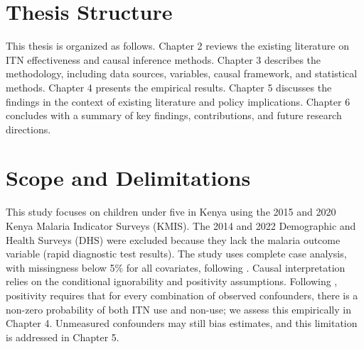 \section{Thesis Structure}

This thesis is organized as follows. Chapter 2 reviews the existing literature on ITN effectiveness and causal inference methods. Chapter 3 describes the methodology, including data sources, variables, causal framework, and statistical methods. Chapter 4 presents the empirical results. Chapter 5 discusses the findings in the context of existing literature and policy implications. Chapter 6 concludes with a summary of key findings, contributions, and future research directions.

\section{Scope and Delimitations}

This study focuses on children under five in Kenya using the 2015 and 2020 Kenya Malaria Indicator Surveys (KMIS). The 2014 and 2022 Demographic and Health Surveys (DHS) were excluded because they lack the malaria outcome variable (rapid diagnostic test results). The study uses complete case analysis, with missingness below 5\% for all covariates, following \citet{little2019statistical}. Causal interpretation relies on the conditional ignorability and positivity assumptions. Following \citet{westreich2010invited}, positivity requires that for every combination of observed confounders, there is a non-zero probability of both ITN use and non-use; we assess this empirically in Chapter 4. Unmeasured confounders may still bias estimates, and this limitation is addressed in Chapter 5.